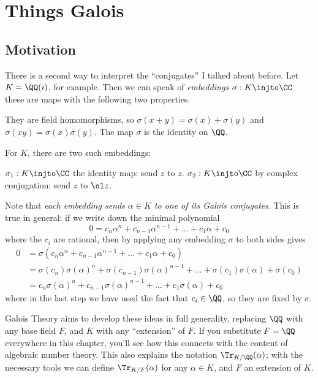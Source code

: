 \chapter{Things Galois}

\section{Motivation}
There is a second way to interpret the ``conjugates'' I talked about before.
Let $K = \QQ(i)$, for example.
Then we can speak of \emph{embeddings} $\sigma : K \injto \CC$ 
these are maps with the following two properties.
\begin{itemize}
	\ii They are field homomorphisms, so $\sigma(x+y)=\sigma(x)+\sigma(y)$ and $\sigma(xy)=\sigma(x)\sigma(y)$.
	\ii The map $\sigma$ is the identity on $\QQ$.
\end{itemize}
For $K$, there are two such embeddings:
\begin{itemize}
	\ii $\sigma_1 : K \injto \CC$ the identity map: send $z$ to $z$.
	\ii $\sigma_2 : K \injto \CC$ by complex conjugation: send $z$ to $\ol z$.
\end{itemize}
Note that \emph{each embedding sends $\alpha \in K$ to one of its Galois conjugates}.
This is true in general: if we write down the minimal polynomial
\[ 0 = c_n \alpha^n + c_{n-1} \alpha^{n-1} + \dots + c_1\alpha + c_0 \]
where the $c_i$ are rational, then by applying any embedding $\sigma$ to both sides gives
\begin{align*}
	0 &= \sigma(c_n \alpha^n + c_{n-1} \alpha^{n-1} + \dots + c_1\alpha + c_0) \\
	&= \sigma(c_n) \sigma(\alpha)^n + \sigma(c_{n-1}) \sigma(\alpha)^{n-1}
	+ \dots + \sigma(c_1)\sigma(\alpha) + \sigma(c_0) \\
	&= c_n \sigma(\alpha)^n + c_{n-1} \sigma(\alpha)^{n-1} + \dots + c_1\sigma(\alpha) + c_0
\end{align*}
where in the last step we have used the fact that $c_i \in \QQ$, so they are fixed by $\sigma$.

Galois Theory aims to develop these ideas in full generality, replacing $\QQ$ with any base field $F$,
and $K$ with any ``extension'' of $F$.
If you substitute $F = \QQ$ everywhere in this chapter,
you'll see how this connects with the content of algebraic number theory.
This also explains the notation $\Tr_{K/\QQ}(\alpha)$;
with the necessary tools we can define $\Tr_{K/F}(\alpha)$ for any $\alpha \in K$,
and $F$ an extension of $K$.

